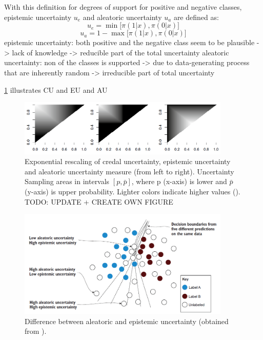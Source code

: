 With this definition for degrees of support for positive and negative classes, epistemic uncertainty $u_e$ and aleatoric uncertainty $u_a$ are defined as:
\begin{equation}
u_e = \min \bigg[ \pi(1 | x), \pi(0 | x) \bigg]
\end{equation}
\begin{equation}
u_a = 1 - \max \bigg[ \pi(1 | x), \pi(0 | x) \bigg]
\end{equation}
epistemic uncertainty: both positive and the negative class seem to be plausible -> lack of knowledge -> reducible part of the total uncertainty
aleatoric uncertainty: non of the classes is supported -> due to data-generating process that are inherently random -> irreducible part of total uncertainty


\ref{fig:uncertainty_measures} illustrates \ac{CU} and \ac{EU} and \ac{AU}

\begin{figure}[t]
  \centering
    \includegraphics[width=0.90\textwidth]{figures/uncertainty_measures.PNG}
  \caption{Exponential rescaling of credal uncertainty, epistemic uncertainty and aleatoric uncertainty measure (from left to right). 
  Uncertainty Sampling areas in intervals $[p, \bar{p}]$, where p (x-axis) is lower and $\bar{p}$ (y-axis) is upper probability. Lighter colors indicate higher values (\cite{nguyen2021howtomeasure}).
  TODO: UPDATE + CREATE OWN FIGURE}
  \label{fig:uncertainty_measures}
\end{figure}



\begin{figure}[t]
  \centering
    \includegraphics[width=0.90\textwidth]{figures/uncertainty_differences.PNG}
  \caption{Difference between aleatoric and epistemic uncertainty (obtained from \cite{human-in-the-loop}).}
  \label{fig:uncertainty_differences}
\end{figure}


